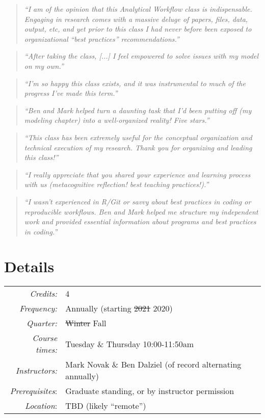 \documentclass[10pt]{article}
\begin{document}
\begin{quote}
	\emph{``I am of the opinion that this Analytical Workflow class is indispensable. Engaging in research comes with a massive deluge of papers, files, data, output, etc, and yet prior to this class I had never before been exposed to organizational ``best practices'' recommendations.''}
\end{quote}
\begin{quote}
	\emph{``After taking the class, [...] I feel empowered to solve issues with my model on my own.''}
\end{quote}
\begin{quote}
	\emph{``I'm so happy this class exists, and it was instrumental to much of the progress I've made this term.''}
\end{quote}
\begin{quote}
\emph{``Ben and Mark helped turn a daunting task that I'd been putting off (my modeling chapter) into a well-organized reality! Five stars.''}
\end{quote}
\begin{quote}
	\emph{``This class has been extremely useful for the conceptual organization and technical execution of my research. Thank you for organizing and leading this class!''}
\end{quote}
\begin{quote}
	\emph{``I really appreciate that you shared your experience and learning process with us (metacognitive reflection! best teaching practices!).''}
\end{quote}
\begin{quote}
	\emph{``I wasn't experienced in R/Git or savvy about best practices in coding or reproducible workflows. Ben and Mark helped me structure my independent work and provided essential information about programs and best practices in coding.''}
\end{quote}


\section*{Details}
\begin{tabular}{rl}
	\emph{Credits:}	&  4\\
	\emph{Frequency:} & Annually (starting \st{2021} 2020)\\
	\emph{Quarter:} & \st{Winter} Fall\\
	\emph{Course times:} &  Tuesday \& Thursday 10:00-11:50am\\
	\emph{Instructors:} & Mark Novak \& Ben Dalziel (of record alternating annually)\\
	\emph{Prerequisites}: & Graduate standing, or by instructor permission\\
	\emph{Location}: & TBD (likely ``remote'')
\end{tabular}
\end{document}
